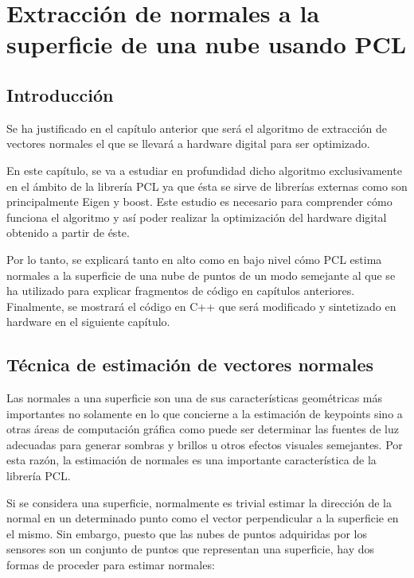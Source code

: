 \chapter{Extracción de normales a la superficie de una nube usando PCL}

\section{Introducción}
Se ha justificado en el capítulo anterior que será el algoritmo de extracción de vectores normales el que se llevará a hardware digital para ser optimizado. 

En este capítulo, se va a estudiar en profundidad dicho algoritmo exclusivamente en el ámbito de la librería PCL ya que ésta se sirve de librerías externas como son principalmente Eigen y boost. Este estudio es necesario para comprender cómo funciona el algoritmo y así poder realizar la optimización del hardware digital obtenido a partir de éste.

Por lo tanto, se explicará tanto en alto como en bajo nivel cómo PCL estima normales a la superficie de una nube de puntos de un modo semejante al que se ha utilizado para explicar fragmentos de código en capítulos anteriores. Finalmente, se mostrará el código en C++ que será modificado y sintetizado en hardware en el siguiente capítulo.


\section{Técnica de estimación de vectores normales}



Las normales a una superficie son una de sus características geométricas más importantes no solamente en lo que concierne a la estimación de keypoints sino a otras áreas de computación gráfica como puede ser determinar las fuentes de luz adecuadas para generar sombras y brillos u otros efectos visuales semejantes. Por esta razón, la estimación de normales es una importante característica de la librería PCL\cite{normal}.

Si se considera una superficie, normalmente es trivial estimar la dirección de la normal en un determinado punto como el vector perpendicular a la superficie en el mismo. Sin embargo, puesto que las nubes de puntos adquiridas por los sensores son un conjunto de puntos que representan una superficie, hay dos formas de proceder para estimar normales:

